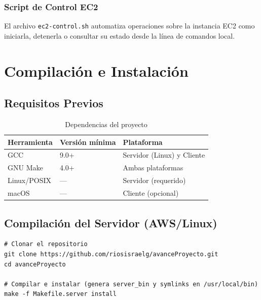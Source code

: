 \documentclass[12pt,a4paper]{report}
\begin{document}
\subsection{Script de Control EC2}

El archivo \texttt{ec2-control.sh} automatiza operaciones sobre la instancia EC2 como iniciarla, detenerla o consultar su estado desde la línea de comandos local.

\chapter{Compilación e Instalación}

\section{Requisitos Previos}

\begin{table}[H]
  \centering
  \begin{tabular}{lll}
    \toprule
    \textbf{Herramienta} & \textbf{Versión mínima} & \textbf{Plataforma} \\
    \midrule
    GCC         & 9.0+ & Servidor (Linux) y Cliente \\
    GNU Make    & 4.0+ & Ambas plataformas \\
    Linux/POSIX & —    & Servidor (requerido) \\
    macOS       & —    & Cliente (opcional) \\
    \bottomrule
  \end{tabular}
  \caption{Dependencias del proyecto}
\end{table}

\section{Compilación del Servidor (AWS/Linux)}

\begin{tcolorbox}[colback=black!85, colframe=black, title=\textcolor{white}{\textbf{Terminal — Servidor}}]
\begin{lstlisting}[style=bashstyle, numbers=none]
# Clonar el repositorio
git clone https://github.com/riosisraelg/avanceProyecto.git
cd avanceProyecto

# Compilar e instalar (genera server_bin y symlinks en /usr/local/bin)
make -f Makefile.server install
\end{lstlisting}
\end{tcolorbox}
\end{document}
